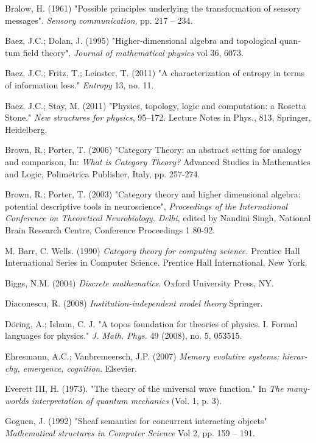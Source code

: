 \documentclass{book}
\theoremstyle{theoremENG}
\theoremstyle{lemmaENG}
\theoremstyle{propositionENG}
\theoremstyle{corollaryENG}
\theoremstyle{factENG}
\theoremstyle{remarkENG}
\theoremstyle{exampleENG}
\theoremstyle{warningENG}
\theoremstyle{questionENG}
\theoremstyle{guessENG}
\theoremstyle{answerENG}
\theoremstyle{constructionENG}
\theoremstyle{rulesENG}
\theoremstyle{excENG}
\theoremstyle{appENG}
\theoremstyle{definitionENG}
\theoremstyle{notationENG}
\theoremstyle{conjectureENG}
\theoremstyle{postulateENG}
\theoremstyle{theoremRUS}
\theoremstyle{lemmaRUS}
\theoremstyle{propositionRUS}
\theoremstyle{corollaryRUS}
\theoremstyle{factRUS}
\theoremstyle{remarkRUS}
\theoremstyle{exampleRUS}
\theoremstyle{warningRUS}
\theoremstyle{questionRUS}
\theoremstyle{guessRUS}
\theoremstyle{answerRUS}
\theoremstyle{constructionRUS}
\theoremstyle{rulesRUS}
\theoremstyle{excRUS}
\theoremstyle{appRUS}
\theoremstyle{definitionRUS}
\theoremstyle{notationRUS}
\theoremstyle{conjectureRUS}
\theoremstyle{postulateRUS}
\begin{document}
\begin{english}
\begin{thebibliography}{SGWB}
 Bralow, H. (1961) "Possible principles underlying the transformation of sensory messages". {\em Sensory communication}, pp. 217 -- 234.

 Baez, J.C.; Dolan, J. (1995) "Higher-dimensional algebra and topological quantum field theory". {\em Journal of mathematical physics} vol 36, 6073.

 Baez, J.C.; Fritz, T.; Leinster, T. (2011) "A characterization of entropy in terms of information loss." {\em Entropy} 13, no. 11.

 Baez, J.C.; Stay, M. (2011) "Physics, topology, logic and computation: a Rosetta Stone." {\em New structures for physics}, 95–172. Lecture Notes in Phys., 813, Springer, Heidelberg.

 Brown, R.; Porter, T. (2006) "Category Theory: an abstract setting for
analogy and comparison, In: {\em What is Category Theory?} Advanced
Studies in Mathematics and Logic, Polimetrica Publisher, Italy, pp. 257-274.

 Brown, R.; Porter, T. (2003) "Category theory and higher dimensional
algebra: potential descriptive tools in neuroscience", {\em Proceedings
of the International Conference on Theoretical Neurobiology, Delhi}, edited by Nandini Singh, National Brain Research
Centre, Conference Proceedings 1 80-92. 

 M. Barr, C. Wells. (1990) {\em Category theory for computing science.} Prentice Hall International Series in Computer Science. Prentice Hall International, New York.

 Biggs, N.M. (2004) {\em Discrete mathematics}. Oxford University Press, NY. 

 Diaconescu, R. (2008) {\em Institution-independent model theory} Springer.

 D\"{o}ring, A.; Isham, C. J. "A topos foundation for theories of physics. I. Formal languages for physics." 
{\em J. Math. Phys.} 49 (2008), no. 5, 053515.

 Ehresmann, A.C.; Vanbremeersch, J.P. (2007) {\em Memory evolutive systems; hierarchy, emergence, cognition}. Elsevier.

 Everett III, H. (1973). "The theory of the universal wave function." In {\em The many-worlds interpretation of quantum mechanics} (Vol. 1, p. 3).

 Goguen, J. (1992) "Sheaf semantics for concurrent interacting objects" {\em Mathematical structures in Computer Science} Vol 2, pp. 159 -- 191.


\end{thebibliography}
\end{english}
\end{document}
